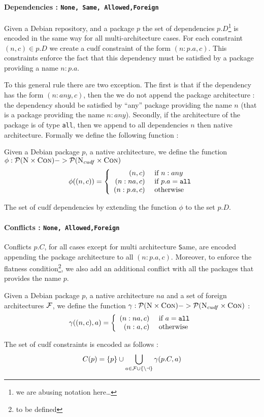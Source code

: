 \paragraph{Dependencies : \texttt{None, Same, Allowed,Foreign}}
Given a Debian repository, and a package $p$ the set of dependencies
$p.D$\footnote{we are abusing notation here\ldots} is encoded in the
same way for all multi-architecture cases. For each constraint $(n,c)
\in p.D$ we create a cudf constraint of the form $(n:p.a,c)$. This
constraints enforce the fact that this dependency must be satisfied by
a package providing a name $n:p.a$.

To this general rule there are two exception. The first is that if the
dependency has the form $(n:any,c)$, then the we do not append the
package architecture : the dependency should be satisfied by ``any''
package providing the name $n$ (that is a package providing the name
$n:any$). Secondly, if the architecture of the package
is of type \texttt{all}, then we append to all dependencies $n$ then
native architecture. Formally we define the following function :

\begin{definition}
  Given a Debian package $p$, a native architecture, we define the
  function $\phi : \mathcal{P}(\textsc{N}\times\textsc{Con}) ->
  \mathcal{P}(\textsc{N}_{cudf}\times\textsc{Con})$
\[
  \phi ((n,c)) = \left\{ 
    \begin{array}{rl}
      (n,c)           & \mbox{ if } n:any \\
      (n:na,c) & \mbox{ if } p.a = \tt{all} \\
      (n:p.a,c)       & \mbox{ otherwise }
    \end{array} 
  \right.
\]

The set of cudf dependencies by extending the function $\phi$ to the
set $p.D$.

\end{definition}

\paragraph{Conflicts : \texttt{None, Allowed,Foreign}}
Conflicts $p.C$, for all cases except for multi architecture {\texttt
Same}, are encoded appending the package architecture to all
$(n:p.a,c)$. Moreover, to enforce the flatness condition\footnote{to
be defined}, we also add an additional conflict with all the packages
that provides the name $p$.

\begin{definition}
  Given a Debian package $p$, a native architecture $na$ and a set of
  foreign architectures $\cal{F}$, we define the function $\gamma :
  \mathcal{P}(\textsc{N}\times\textsc{Con}) -> \mathcal{P}(\textsc{N}_{cudf}\times\textsc{Con})$ :
\[
  \gamma ((n,c),a) = \left\{ 
    \begin{array}{rl}
      (n:na,c) & \mbox{ if } a = \tt{all} \\
      (n:a,c)        &  \mbox{ otherwise }
    \end{array} 
  \right.
\]

The set of cudf constraints is encoded as follows : 
\[
  C(p) = \{ p \} \cup \bigcup_{a \in \cal{F} \cup \{ na \} } \gamma(p.C,a)
\]
\end{definition}

